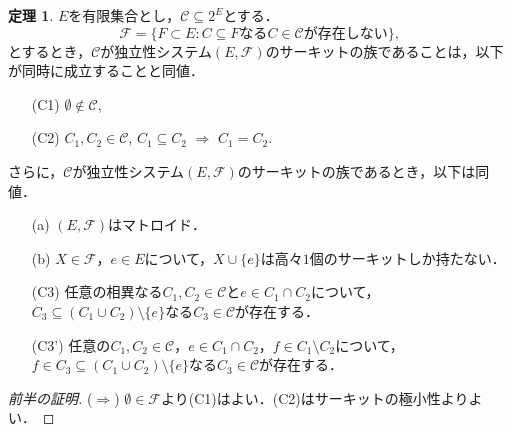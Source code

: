 \documentclass[xelatex,ja=standard,a4paper,14pt,everyparhook=compat]{bxjsarticle}
\theoremstyle{definition}
\newtheorem{theorem}{定理}[subsection]
\begin{document}
\begin{theorem}
    $E$を有限集合とし，$\mathcal{C} \subseteq 2^E$とする．\begin{equation*}
        \mathcal{F} = \{F \subset E : \text{$C \subseteq F$なる$C \in \mathcal{C}$が存在しない}\},
    \end{equation*}
    とするとき，$\mathcal{C}$が独立性システム$(E, \mathcal{F})$のサーキットの族であることは，以下が同時に成立することと同値． \begin{enumerate}
        \item[(C1)] $\emptyset \notin \mathcal{C}$,
        \item[(C2)] $C_1, C_2 \in \mathcal{C}$, $C_1 \subseteq C_2$ $\Longrightarrow$ $C_1 = C_2$.
    \end{enumerate}
    さらに，$\mathcal{C}$が独立性システム$(E, \mathcal{F})$のサーキットの族であるとき，以下は同値． \begin{enumerate}
        \item[(a)] $(E, \mathcal{F})$はマトロイド．
        \item[(b)] $X \in \mathcal{F}$，$e \in E$について，$X \cup \{e\}$は高々$1$個のサーキットしか持たない．
        \item[(C3)] 任意の相異なる$C_1, C_2 \in \mathcal{C}$と$e \in C_1 \cap C_2$について，$C_3 \subseteq (C_1 \cup C_2) \setminus \{e\}$なる$C_3 \in \mathcal{C}$が存在する．
        \item[(C3')] 任意の$C_1, C_2 \in \mathcal{C}$，$e \in C_1 \cap C_2$，$f \in C_1 \setminus C_2$について，$f \in C_3 \subseteq (C_1 \cup C_2) \setminus \{e\}$なる$C_3 \in \mathcal{C}$が存在する．
    \end{enumerate}
    \begin{proof}[\textup{前半の証明}]
        ($\Longrightarrow$) $\emptyset \in \mathcal{F}$より(C1)はよい．(C2)はサーキットの極小性よりよい．


\end{proof}
\end{theorem}
\end{document}

